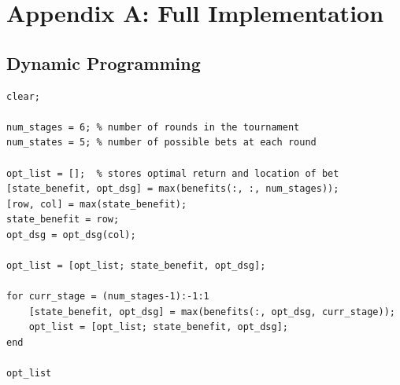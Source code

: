 \documentclass[12pt]{article}
\begin{document}
\newpage
\section{Appendix A: Full Implementation}
\subsection{Dynamic Programming}
\begin{verbatim}
clear;

num_stages = 6;	% number of rounds in the tournament
num_states = 5;	% number of possible bets at each round

opt_list = [];	% stores optimal return and location of bet
[state_benefit, opt_dsg] = max(benefits(:, :, num_stages));
[row, col] = max(state_benefit);
state_benefit = row;
opt_dsg = opt_dsg(col);

opt_list = [opt_list; state_benefit, opt_dsg];

for curr_stage = (num_stages-1):-1:1
	[state_benefit, opt_dsg] = max(benefits(:, opt_dsg, curr_stage));
	opt_list = [opt_list; state_benefit, opt_dsg];
end

opt_list
\end{verbatim}

\begingroup
    \fontsize{8pt}{10pt}
    \lstset{breaklines=true}
	
\end{document}
